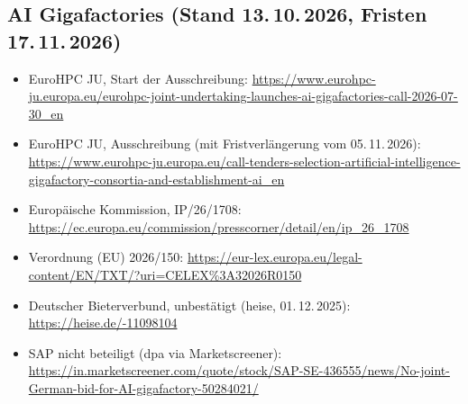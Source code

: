 \documentclass[a4paper,11pt]{article}
\begin{document}
{\subsection*{AI Gigafactories (Stand 13.\,10.\,2026, Fristen 17.\,11.\,2026)}
\begin{itemize}[itemsep=0.1em]
  \item EuroHPC JU, Start der Ausschreibung:
    \url{https://www.eurohpc-ju.europa.eu/eurohpc-joint-undertaking-launches-ai-gigafactories-call-2026-07-30_en}
  \item EuroHPC JU, Ausschreibung (mit Fristverlängerung vom
    05.\,11.\,2026):
    \url{https://www.eurohpc-ju.europa.eu/call-tenders-selection-artificial-intelligence-gigafactory-consortia-and-establishment-ai_en}
  \item Europäische Kommission, IP/26/1708:
    \url{https://ec.europa.eu/commission/presscorner/detail/en/ip_26_1708}
  \item Verordnung (EU) 2026/150:
    \url{https://eur-lex.europa.eu/legal-content/EN/TXT/?uri=CELEX%3A32026R0150}
  \item Deutscher Bieterverbund, unbestätigt (heise, 01.\,12.\,2025):
    \url{https://heise.de/-11098104}
  \item SAP nicht beteiligt (dpa via Marketscreener):
    \url{https://in.marketscreener.com/quote/stock/SAP-SE-436555/news/No-joint-German-bid-for-AI-gigafactory-50284021/}
\end{itemize}

}
\end{document}
